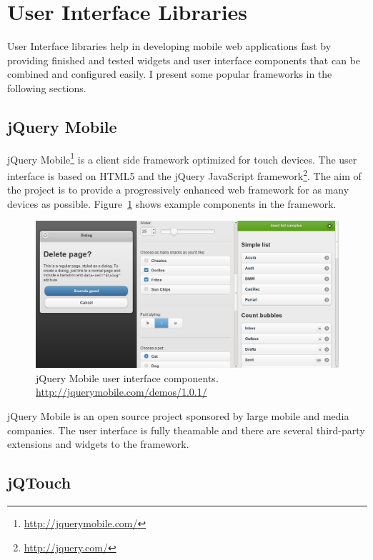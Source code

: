 \section{User Interface Libraries}

User Interface libraries help in developing mobile web applications
fast by providing finished and tested widgets and user interface
components that can be combined and configured easily. I present some
popular frameworks in the following sections.

\subsection{jQuery Mobile}

jQuery Mobile\footnote{\url{http://jquerymobile.com/}} is a client
side framework optimized for touch devices. The user interface is
based on HTML5 and the jQuery JavaScript
framework\footnote{\url{http://jquery.com/}}. The aim of the project
is to provide a progressively enhanced web framework for as many
devices as possible. Figure~\ref{figure:jquerymobile.png} shows
example components in the framework.

\begin{figure}[ht]
  \begin{center}
    \includegraphics[width=\textwidth]{images/jquerymobile.png}
    \caption{jQuery Mobile user interface
      components. \url{http://jquerymobile.com/demos/1.0.1/}}
    \label{figure:jquerymobile.png}
  \end{center}
\end{figure}

jQuery Mobile is an open source project sponsored by large mobile and
media companies. The user interface is fully theamable and there are
several third-party extensions and widgets to the framework.

\subsection{jQTouch}

